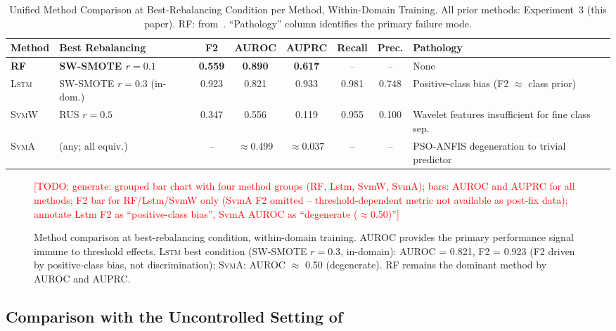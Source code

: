 \documentclass[lettersize,journal]{IEEEtran}
\newcommand{\todo}[1]{\textcolor{red}{[TODO: #1]}}
\newcommand{\Impl}[1]{\textsc{#1}}
\begin{document}
\begin{table}[!t]
\caption{Unified Method Comparison at Best-Rebalancing Condition per Method, Within-Domain Training. All prior methods: Experiment~3 (this paper). RF: from~\cite{nakagama2026tiv}. ``Pathology'' column identifies the primary failure mode.\label{tab:method_comparison}}
\centering
\small
\begin{tabular}{|l|l|c|c|c|c|c|l|}
\hline
Method & Best Rebalancing & F2 & AUROC & AUPRC & Recall & Prec. & Pathology \\
\hline
\textbf{RF}~\cite{nakagama2026tiv} & \textbf{SW-SMOTE $r\!=\!0.1$} & \textbf{0.559} & \textbf{0.890} & \textbf{0.617} & -- & -- & None \\
\hline
\Impl{Lstm}~\cite{wang2022} & SW-SMOTE $r\!=\!0.3$ (in-dom.) & 0.923 & 0.821 & 0.933 & 0.981 & 0.748 & Positive-class bias (F2 $\approx$ class prior) \\
\hline
\Impl{SvmW}~\cite{zhao2012} & RUS $r\!=\!0.5$ & 0.347 & 0.556 & 0.119 & 0.955 & 0.100 & Wavelet features insufficient for fine class sep. \\
\hline
\Impl{SvmA}~\cite{arefnezhad2019} & (any; all equiv.) & -- & $\approx$0.499 & $\approx$0.037 & -- & -- & PSO-ANFIS degeneration to trivial predictor \\
\hline
\end{tabular}
\end{table}

\begin{figure}[!t]
\centering
\todo{generate: grouped bar chart with four method groups (RF, Lstm, SvmW, SvmA); bars: AUROC and AUPRC for all methods; F2 bar for RF/Lstm/SvmW only (SvmA F2 omitted -- threshold-dependent metric not available as post-fix data); annotate Lstm F2 as ``positive-class bias'', SvmA AUROC as ``degenerate ($\approx$0.50)''}
\caption{Method comparison at best-rebalancing condition, within-domain training.
AUROC provides the primary performance signal immune to threshold effects.
\Impl{Lstm} best condition (SW-SMOTE $r{=}0.3$, in-domain): AUROC = 0.821, F2 = 0.923 (F2 driven by positive-class bias, not discrimination); \Impl{SvmA}: AUROC $\approx$ 0.50 (degenerate). RF remains the dominant method by AUROC and AUPRC.}
\label{fig:method_comparison}
\end{figure}

\subsection{Comparison with the Uncontrolled Setting of~\cite{nakagama2025iv}}
\label{sec:iv_comparison}
\end{document}
